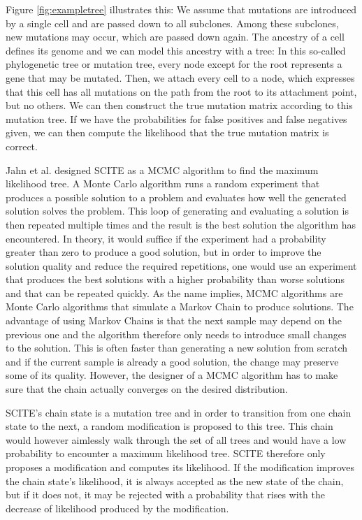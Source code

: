 
Figure \ref{fig:exampletree} illustrates this: We assume that mutations are introduced by a single cell and are passed down to all subclones. Among these subclones, new mutations may occur, which are passed down again. The ancestry of a cell defines its genome and we can model this ancestry with a tree: In this so-called phylogenetic tree or mutation tree, every node except for the root represents a gene that may be mutated. Then, we attach every cell to a node, which expresses that this cell has all mutations on the path from the root to its attachment point, but no others. We can then construct the true mutation matrix according to this mutation tree. If we have the probabilities for false positives and false negatives given, we can then compute the likelihood that the true mutation matrix is correct.

Jahn et al. designed \ac{SCITE} as a \ac{MCMC} algorithm to find the maximum likelihood tree. A Monte Carlo algorithm runs a random experiment that produces a possible solution to a problem and evaluates how well the generated solution solves the problem. This loop of generating and evaluating a solution is then repeated multiple times and the result is the best solution the algorithm has encountered. In theory, it would suffice if the experiment had a probability greater than zero to produce a good solution, but in order to improve the solution quality and reduce the required repetitions, one would use an experiment that produces the best solutions with a higher probability than worse solutions and that can be repeated quickly. As the name implies, \ac{MCMC} algorithms are Monte Carlo algorithms that simulate a Markov Chain to produce solutions. The advantage of using Markov Chains is that the next sample may depend on the previous one and the algorithm therefore only needs to introduce small changes to the solution. This is often faster than generating a new solution from scratch and if the current sample is already a good solution, the change may preserve some of its quality. However, the designer of a \ac{MCMC} algorithm has to make sure that the chain actually converges on the desired distribution.

\ac{SCITE}'s chain state is a mutation tree and in order to transition from one chain state to the next, a random modification is proposed to this tree. This chain would however aimlessly walk through the set of all trees and would have a low probability to encounter a maximum likelihood tree. \ac{SCITE} therefore only proposes a modification and computes its likelihood. If the modification improves the chain state's likelihood, it is always accepted as the new state of the chain, but if it does not, it may be rejected with a probability that rises with the decrease of likelihood produced by the modification.

